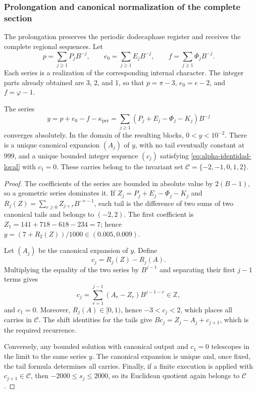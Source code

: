 \subsubsection{Prolongation and canonical normalization of the complete section}
\label{subsec:alpha-completa}

The prolongation preserves the periodic dodecaphase register and receives the
complete regional sequences. Let
\[
 p=\sum_{j\geq1}P_jB^{-j},\qquad
 e_0=\sum_{j\geq1}E_jB^{-j},\qquad
 f=\sum_{j\geq1}\Phi_jB^{-j}.
\]
Each series is a realization of the corresponding internal character. The
integer parts already obtained are 3, 2, and 1, so that
\(p=\pi-3\), \(e_0=e-2\), and
\(f=\varphi-1\).

\begin{proposition}
\label{prop:alpha-normalizacion}
The series
\begin{equation}
 y=p+e_0-f-\kappa_{\mathrm{per}}
   =\sum_{j\geq1}(P_j+E_j-\Phi_j-K_j)B^{-j}
 \label{eq:alpha-serie}
\end{equation}
converges absolutely. In the domain of the resulting blocks,
\(0<y<10^{-2}\). There is a unique canonical expansion \((A_j)\) of
\(y\), with no tail eventually constant at 999, and a unique bounded
integer sequence \((c_j)\) satisfying \eqref{eq:alpha-identidad-local} with
\(c_1=0\). These carries belong to the invariant set
\(\mathcal C=\{-2,-1,0,1,2\}\).
\end{proposition}

\begin{proof}
The coefficients of the series are bounded in absolute value by
\(2(B-1)\), so a geometric series dominates it. If
\(Z_j=P_j+E_j-\Phi_j-K_j\) and
\(R_j(Z)=\sum_{r\geq0}Z_{j+r}B^{-r-1}\), each tail is the difference of
two sums of two canonical tails and belongs to \((-2,2)\). The first
coefficient is \(Z_1=141+718-618-234=7\); hence
\(y=(7+R_2(Z))/1000\in(0.005,0.009)\).

Let \((A_j)\) be the canonical expansion of \(y\). Define
\[
 c_j=R_j(Z)-R_j(A).
\]
Multiplying the equality of the two series by \(B^{j-1}\) and separating
their first \(j-1\) terms gives
\[
 c_j=\sum_{r=1}^{j-1}(A_r-Z_r)B^{j-1-r}\in\mathbb Z,
\]
and \(c_1=0\). Moreover, \(R_j(A)\in[0,1)\), hence
\(-3<c_j<2\), which places all carries in \(\mathcal C\). The shift
identities for the tails give \(Bc_j=Z_j-A_j+c_{j+1}\), which is the
required recurrence.

Conversely, any bounded solution with canonical output and \(c_1=0\)
telescopes in the limit to the same series \(y\). The canonical expansion is
unique and, once fixed, the tail formula determines all carries. Finally, if
a finite execution is applied with \(c_{j+1}\in\mathcal C\), then
\(-2000\leq s_j\leq2000\), so its Euclidean quotient again belongs to
\(\mathcal C\).
\end{proof}

